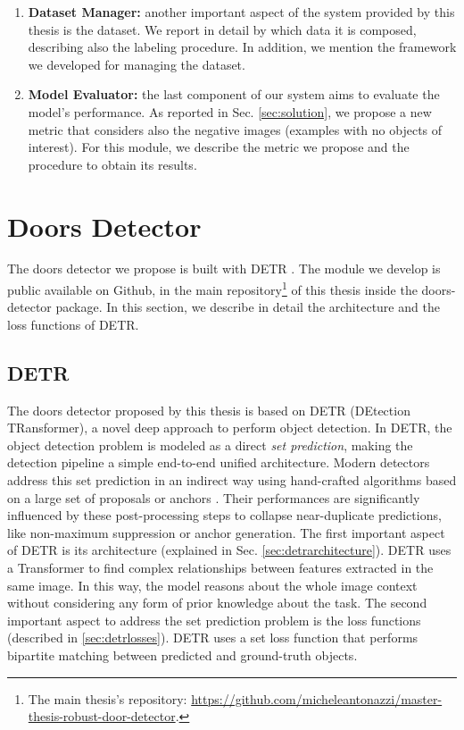 \begin{enumerate}
	\item \textbf{Dataset Manager:} another important aspect of the system provided by this thesis is the dataset. We report in detail by which data it is composed, describing also the labeling procedure. In addition, we mention the framework we developed for managing the dataset.
	\item  \textbf{Model Evaluator:} the last component of our system aims to evaluate the model's performance. As reported in Sec. \ref{sec:solution}, we propose a new metric that considers also the negative images (examples with no objects of interest). For this module, we describe the metric we propose and the procedure to obtain its results.
\end{enumerate}


\section{Doors Detector}
\label{sec:doors_detector}

The doors detector we propose is built with DETR \cite{detr}. The module we develop is public available on Github, in the main repository\footnote{The main thesis's repository: \url{https://github.com/micheleantonazzi/master-thesis-robust-door-detector}.} of this thesis inside the \textsf{doors-detector} package. In this section, we describe in detail the architecture and the loss functions of DETR.

\subsection{DETR}
\label{sec:detr}
The doors detector proposed by this thesis is based on DETR \cite{detr} (DEtection TRansformer), a novel deep approach to perform object detection.  In DETR, the object detection problem is modeled as a direct \textit{set prediction}, making the detection pipeline a simple end-to-end unified architecture. Modern detectors address this set prediction in an indirect way using hand-crafted algorithms based on a large set of proposals \cite{yolo} or anchors \cite{focalloss}. Their performances are significantly influenced by these post-processing steps to collapse near-duplicate predictions, like non-maximum suppression or anchor generation. The first important aspect of DETR  is its architecture (explained in Sec. \ref{sec:detrarchitecture}). DETR uses a Transformer to find complex relationships between features extracted in the same image. In this way, the model reasons about the whole image context without considering any form of prior knowledge about the task. The second important aspect to address the set prediction problem is the loss functions (described in \ref{sec:detrlosses}). DETR uses a set loss function that performs bipartite matching between predicted and ground-truth objects.

